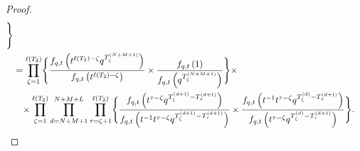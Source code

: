 \documentclass[12pt,reqno,a4paper]{amsart}
\numberwithin{equation}{section}
\theoremstyle{definition}
\begin{document}
\begin{proof}
\begin{align}
{	}
	\Biggr\}
	\notag 
	\\
	&=
	\prod_{\zeta = 1}^{\ell(T_2)}
	\Biggl\{
	\frac{f_{q,t}\left(		t^{\ell(T_2) - \zeta} q^{ T^{(N+M+1)}_{\zeta}		}					\right)}{
		f_{q,t}\left(		t^{\ell(T_2) - \zeta} 					\right)
	}
	\times 
	\frac{
		f_{q,t}\left(	1					\right)
	}{
		f_{q,t}\left(q^{ T^{(N+M+1)}_{\zeta} 		}						\right)
	} 
	\Biggr\}
	\times
	\notag 
	\\
	&\hspace{0.3cm}\times 
	\prod_{\zeta = 1}^{\ell(T_2)}
	\prod_{d = N+M+1}^{N+M+L}
	\prod_{\tau = \zeta + 1}^{\ell(T_2)}
	\Biggl\{
	\frac{
		f_{q,t}\left(	t^{\tau - \zeta} q^{ T^{(d+1)}_{\zeta} 	- T^{(d+1)}_{\tau}	 		}						\right)
	}{
		f_{q,t}\left(		t^{-1}		
		t^{\tau - \zeta} q^{ T^{(d+1)}_{\zeta} 	- T^{(d+1)}_{\tau}			}					\right)
	}
	\times
	\frac{
		f_{q,t}\left(		t^{-1}		
		t^{\tau - \zeta} q^{ T^{(d)}_{\zeta} 	- T^{(d+1)}_{\tau} 		}					\right)
	}{
		f_{q,t}\left(	t^{\tau - \zeta} q^{ T^{(d)}_{\zeta} 	- T^{(d+1)}_{\tau}		}						\right)
	}
	\Biggr\}.
	\notag  
\end{align}
\normalsize
\end{proof}
\end{document}
